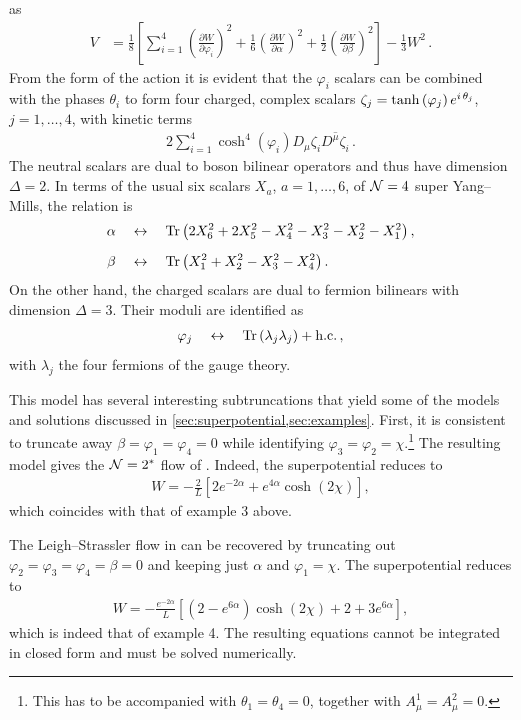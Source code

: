 as
\begin{align}
V&=\frac18\left[\sum_{i=1}^4\left(\frac{\partial W}{\partial\varphi_i}\right)^2+\frac16\left(\frac{\partial W}{\partial\alpha}\right)^2+\frac12\left(\frac{\partial W}{\partial\beta}\right)^2\right]-\frac13W^2\,.\nonumber
\end{align}
From the form of the action it is evident that the $\varphi_i$ scalars can be combined with the phases $\theta_i$ to form four charged, complex scalars $\zeta_j=\tanh{(\varphi_j)}\,e^{i\,\theta_j}$, $j=1,\dots,4$, with kinetic terms 
\begin{align}
2\sum_{i=1}^4\cosh^4(\varphi_i)D_\mu\zeta_i\overline{D^\mu\zeta_i}\,.
\end{align}
The neutral scalars are dual to boson bilinear operators and thus have dimension $\Delta=2$.
In terms of the usual six scalars $X_a$, $a=1,\dots,6$, of $\mathcal{N}=4$ super Yang--Mills, the relation is
\begin{align}
\alpha\quad&\leftrightarrow\quad \operatorname{Tr}\left(2X_6^2+2X_5^2-X_4^2-X_3^2-X_2^2-X_1^2\right),\nonumber\\[2mm]
\beta\quad&\leftrightarrow\quad\operatorname{Tr}\left(X_1^2+X_2^2-X_3^2-X_4^2\right).
\end{align}
On the other hand, the charged scalars are dual to fermion bilinears with dimension $\Delta=3$.
Their moduli are identified as 
\begin{align}
\varphi_j\quad\leftrightarrow\quad\operatorname{Tr}\left(\lambda_j\lambda_j\right)+\text{h.c.}\,,
\end{align}
with $\lambda_j$ the four fermions of the gauge theory. 

This model has several interesting subtruncations that yield some of the models and solutions discussed in \cref{sec:superpotential,sec:examples}.
First, it is consistent to truncate away $\beta=\varphi_1=\varphi_4=0$ while identifying $\varphi_3=\varphi_2=\chi$.\footnote{This has to be accompanied with $\theta_1=\theta_4=0$, together with $A^1_\mu=A^2_\mu=0$.}
The resulting model gives the $\mathcal{N}=2^*$ flow of \cite{Pilch:2000ue}.
Indeed, the superpotential reduces to 
\begin{align}
W=-\frac{2}{L}\left[2e^{-2\alpha}+e^{4\alpha}\cosh(2\chi)\right],
\end{align}
which coincides with that of example 3 above.

The Leigh--Strassler flow in \cite{Pilch:2000fu} can be recovered by truncating out $\varphi_2=\varphi_3=\varphi_4=\beta=0$ and keeping just $\alpha$ and $\varphi_1=\chi$.
The superpotential reduces to 
\begin{align}
  W=-\frac{e^{-2\alpha}}{L}\left[\left(2-e^{6\alpha}\right)\cosh(2\chi)+2+3e^{6\alpha}\right],  
\end{align}
which is indeed that of example 4.
The resulting equations cannot be integrated in closed form and must be solved numerically. 

